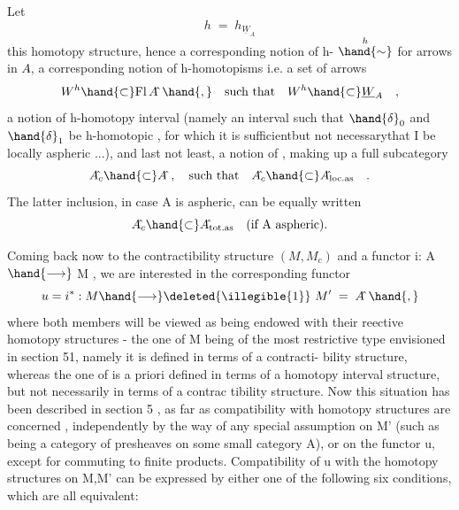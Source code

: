 
Let
\[ h \;=\; h_{\underline{W}_A} \]
this homotopy structure, hence a corresponding notion of h-\hand{\uline{\textcolor{black}{equivalence}}} 
$\overset{h}{\hand{\sim}}$ for arrows in $A\hat{}$, a corresponding notion of h-homotopisms i.e.
a set of arrows
\[ W^h \hand{\subset} \mathrm{Fl}\,A\hat{}\ \hand{,} \quad \text{such that} \quad W^h \hand{\subset} \underline{W}_A \quad , \]
a notion  of h-homotopy interval (namely an interval such that $\hand{\delta}_0$ and $\hand{\delta}_1$
be  h-homotopic , for which it is sufficient\hand{,}but not necessary\hand{,}that I
be locally aspheric ...), and last not least, a notion of \hand{\uline{\textcolor{black}{contractible}}}
\hand{\uline{\textcolor{black}{objects}}}, making up a full subcategory
\[ A\hat{}_c \hand{\subset} A\hat{}\ , \quad \text{such that} \quad A\hat{}_c \hand{\subset} A\hat{}_{\mathrm{loc.as}} \quad . \]
The latter inclusion, in case A is aspheric, can be equally written
\[ A\hat{}_c \hand{\subset} A\hat{}_{\mathrm{tot.as}} \quad \text{(if A aspheric).} \]

Coming back now to the contractibility structure $(M,M_c)$\hand{,} and a
functor  i: A $\hand{\longrightarrow}$ M , we are interested in the corresponding functor
\[ u = i^* : M \hand{\longrightarrow} \deleted{\illegible{1}}\ M' \;=\; A\hat{}\ \hand{,} \]
where both members will be viewed as being endowed with their reective
homotopy structures  -  the one of M being of the most restrictive type
envisioned in section 51, namely it is  defined in terms of a contracti-%
bility structure, whereas the one of is a priori defined in terms of
a homotopy interval structure, but not necessarily in terms of a contrac
tibility structure. Now this situation has been described in section
5 , as far as compatibility with homotopy structures are concerned ,
independently by the way of any special assumption on M'  (such as being
a category of presheaves on some small category A), or on the functor
u, except for commuting to finite products. Compatibility of u  with
the homotopy structures on M,M'  can be expressed by either one of the
following six conditions, which are all equivalent:


